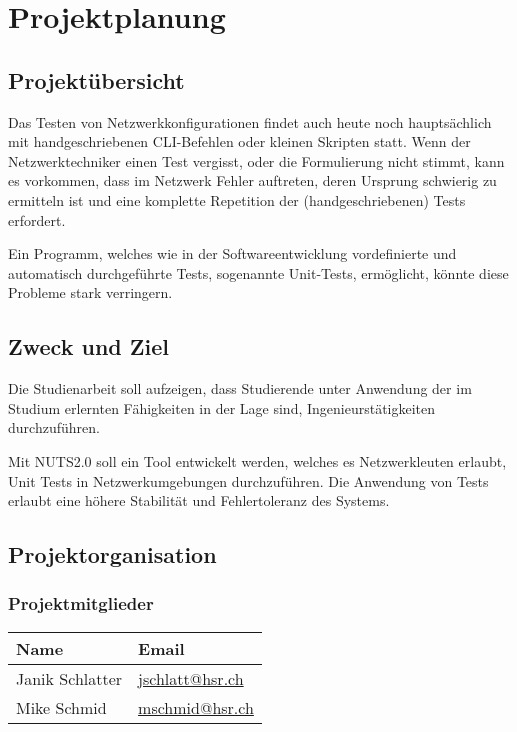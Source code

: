 \documentclass[]{subfiles}
\begin{document}
\section{Projektplanung}
    \subsection{Projektübersicht}
    Das Testen von Netzwerkkonfigurationen findet auch heute noch hauptsächlich 
    mit handgeschriebenen CLI-Befehlen oder kleinen Skripten statt. 
    Wenn der Netzwerktechniker einen Test vergisst, oder die Formulierung nicht stimmt,	
    kann es vorkommen, dass im Netzwerk Fehler auftreten, deren Ursprung schwierig zu 
    ermitteln ist und eine komplette Repetition der (handgeschriebenen) Tests erfordert.

    Ein Programm, welches wie in der Softwareentwicklung vordefinierte und automatisch 
    durchgeführte Tests, sogenannte Unit-Tests, ermöglicht, könnte diese Probleme 
    stark verringern.

    \subsection{Zweck und Ziel}

    Die Studienarbeit soll aufzeigen, dass Studierende unter Anwendung der im Studium erlernten
    Fähigkeiten in der Lage sind, Ingenieurstätigkeiten durchzuführen.
    
    Mit NUTS2.0 soll ein Tool entwickelt werden, welches es Netzwerkleuten erlaubt, 
    Unit Tests in Netzwerkumgebungen durchzuführen. 
    Die Anwendung von Tests erlaubt eine höhere Stabilität und Fehlertoleranz des Systems.

    \subsection{Projektorganisation}
        \subsubsection{Projektmitglieder}
            \begin{tabularx}{0.9\textwidth}{lX}
                \toprule
                Name & Email \\
                \midrule
                Janik Schlatter & \url{jschlatt@hsr.ch} \\
                Mike Schmid & \url{mschmid@hsr.ch} \\
                \bottomrule
            \end{tabularx}
\end{document}

